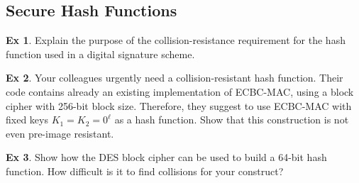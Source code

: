 \documentclass[10pt,\jkfside,a4paper]{article}
\theoremstyle{definition}
\newtheorem{ex}{Ex}
\begin{document}

\subsection{Secure Hash Functions}

\begin{ex}

    Explain the purpose of the collision-resistance requirement for the hash function used in a digital signature scheme.

\end{ex}


\begin{ex}

    Your colleagues urgently need a collision-resistant hash function. Their code contains already an existing implementation of ECBC-MAC, using a block cipher with 256-bit block size. Therefore, they suggest to use ECBC-MAC with fixed keys $K_1 = K_2 = 0^\ell$ as a hash function. Show that this construction is not even pre-image resistant.

\end{ex}


\begin{ex}

    Show how the DES block cipher can be used to build a 64-bit hash function. How difficult is it to find collisions for your construct?

\end{ex}

\end{document}
